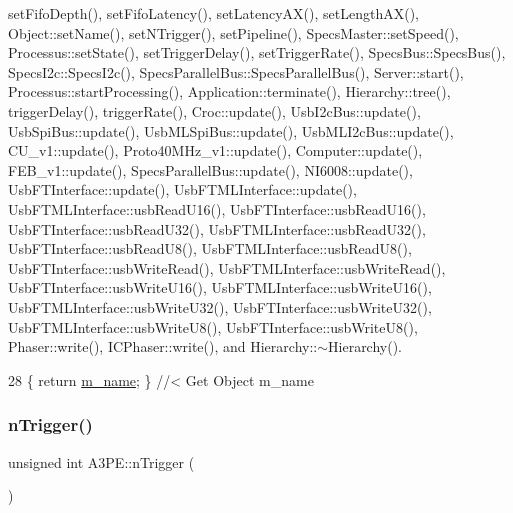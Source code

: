 set\+Fifo\+Depth(), set\+Fifo\+Latency(), set\+Latency\+A\+X(), set\+Length\+A\+X(), Object\+::set\+Name(), set\+N\+Trigger(), set\+Pipeline(), Specs\+Master\+::set\+Speed(), Processus\+::set\+State(), set\+Trigger\+Delay(), set\+Trigger\+Rate(), Specs\+Bus\+::\+Specs\+Bus(), Specs\+I2c\+::\+Specs\+I2c(), Specs\+Parallel\+Bus\+::\+Specs\+Parallel\+Bus(), Server\+::start(), Processus\+::start\+Processing(), Application\+::terminate(), Hierarchy\+::tree(), trigger\+Delay(), trigger\+Rate(), Croc\+::update(), Usb\+I2c\+Bus\+::update(), Usb\+Spi\+Bus\+::update(), Usb\+M\+L\+Spi\+Bus\+::update(), Usb\+M\+L\+I2c\+Bus\+::update(), C\+U\+\_\+v1\+::update(), Proto40\+M\+Hz\+\_\+v1\+::update(), Computer\+::update(), F\+E\+B\+\_\+v1\+::update(), Specs\+Parallel\+Bus\+::update(), N\+I6008\+::update(), Usb\+F\+T\+Interface\+::update(), Usb\+F\+T\+M\+L\+Interface\+::update(), Usb\+F\+T\+M\+L\+Interface\+::usb\+Read\+U16(), Usb\+F\+T\+Interface\+::usb\+Read\+U16(), Usb\+F\+T\+Interface\+::usb\+Read\+U32(), Usb\+F\+T\+M\+L\+Interface\+::usb\+Read\+U32(), Usb\+F\+T\+Interface\+::usb\+Read\+U8(), Usb\+F\+T\+M\+L\+Interface\+::usb\+Read\+U8(), Usb\+F\+T\+Interface\+::usb\+Write\+Read(), Usb\+F\+T\+M\+L\+Interface\+::usb\+Write\+Read(), Usb\+F\+T\+Interface\+::usb\+Write\+U16(), Usb\+F\+T\+M\+L\+Interface\+::usb\+Write\+U16(), Usb\+F\+T\+M\+L\+Interface\+::usb\+Write\+U32(), Usb\+F\+T\+Interface\+::usb\+Write\+U32(), Usb\+F\+T\+M\+L\+Interface\+::usb\+Write\+U8(), Usb\+F\+T\+Interface\+::usb\+Write\+U8(), Phaser\+::write(), I\+C\+Phaser\+::write(), and Hierarchy\+::$\sim$\+Hierarchy().


\begin{DoxyCode}
28 \{ \textcolor{keywordflow}{return} \hyperlink{classObject_a8b83c95c705d2c3ba0d081fe1710f48d}{m\_name}; \} \textcolor{comment}{//< Get Object m\_name}
\end{DoxyCode}
\mbox{\label{classA3PE_a3398fa3ce59a4b1b946e7b4ab4912580}} 
\subsubsection{\texorpdfstring{n\+Trigger()}{nTrigger()}}
{\footnotesize\ttfamily unsigned int A3\+P\+E\+::n\+Trigger (\begin{DoxyParamCaption}{ }\end{DoxyParamCaption})}



